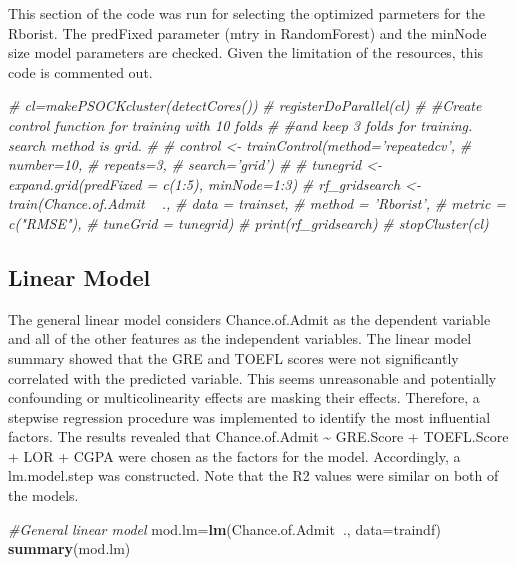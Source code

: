 \documentclass[11pt,]{article}
\newenvironment{Shaded}{\begin{snugshade}}{\end{snugshade}}
\newcommand{\CommentTok}[1]{\textcolor[rgb]{0.56,0.35,0.01}{\textit{#1}}}
\newcommand{\DataTypeTok}[1]{\textcolor[rgb]{0.13,0.29,0.53}{#1}}
\newcommand{\KeywordTok}[1]{\textcolor[rgb]{0.13,0.29,0.53}{\textbf{#1}}}
\newcommand{\NormalTok}[1]{#1}
\newcommand{\OperatorTok}[1]{\textcolor[rgb]{0.81,0.36,0.00}{\textbf{#1}}}
\begin{document}
This section of the code was run for selecting the optimized parmeters
for the Rborist. The predFixed parameter (mtry in RandomForest) and the
minNode size model parameters are checked. Given the limitation of the
resources, this code is commented out.

\begin{Shaded}
\begin{Highlighting}[]
\CommentTok{# cl=makePSOCKcluster(detectCores())}
\CommentTok{# registerDoParallel(cl)}
\CommentTok{# #Create control function for training with 10 folds}
\CommentTok{# #and keep 3 folds for training. search method is grid.}
\CommentTok{# }
\CommentTok{# control <- trainControl(method='repeatedcv',}
\CommentTok{#                         number=10,}
\CommentTok{#                         repeats=3,}
\CommentTok{#                         search='grid')}
\CommentTok{# }
\CommentTok{# tunegrid <- expand.grid(predFixed = c(1:5), minNode=1:3)}
\CommentTok{# rf_gridsearch <- train(Chance.of.Admit ~ .,}
\CommentTok{#                        data = trainset,}
\CommentTok{#                        method = 'Rborist',}
\CommentTok{#                        metric = c("RMSE"),}
\CommentTok{#                       tuneGrid = tunegrid)}
\CommentTok{# print(rf_gridsearch)}
\CommentTok{# stopCluster(cl)}
\end{Highlighting}
\end{Shaded}

\hypertarget{linear-model}{%
\subsection{Linear Model}\label{linear-model}}

The general linear model considers Chance.of.Admit as the dependent
variable and all of the other features as the independent variables. The
linear model summary showed that the GRE and TOEFL scores were not
significantly correlated with the predicted variable. This seems
unreasonable and potentially confounding or multicolinearity effects are
masking their effects. Therefore, a stepwise regression procedure was
implemented to identify the most influential factors. The results
revealed that Chance.of.Admit \textasciitilde{} GRE.Score + TOEFL.Score
+ LOR + CGPA were chosen as the factors for the model. Accordingly, a
lm.model.step was constructed. Note that the R2 values were similar on
both of the models.

\begin{Shaded}
\begin{Highlighting}[]
\CommentTok{#General linear model}
\NormalTok{mod.lm=}\KeywordTok{lm}\NormalTok{(Chance.of.Admit}\OperatorTok{~}\NormalTok{., }\DataTypeTok{data=}\NormalTok{traindf) }
\KeywordTok{summary}\NormalTok{(mod.lm)}
\end{Highlighting}
\end{Shaded}
\end{document}
